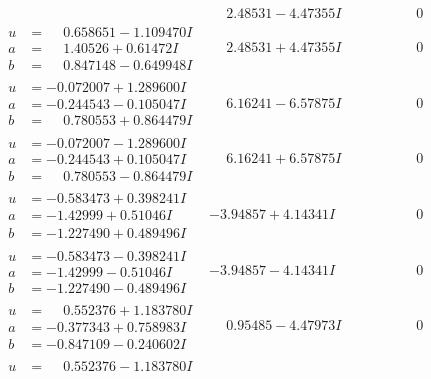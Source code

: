 \documentclass[1p]{elsarticle_modified}
\theoremstyle{definition}
\begin{document}
$$\begin{array}{c|c|c}
 & \phantom{-}2.48531 - 4.47355 I & \phantom{-0.000000 } 0 \\ \hline\begin{aligned}
u &= \phantom{-}0.658651 - 1.109470 I \\
a &= \phantom{-}1.40526 + 0.61472 I \\
b &= \phantom{-}0.847148 - 0.649948 I\end{aligned}
 & \phantom{-}2.48531 + 4.47355 I & \phantom{-0.000000 } 0 \\ \hline\begin{aligned}
u &= -0.072007 + 1.289600 I \\
a &= -0.244543 - 0.105047 I \\
b &= \phantom{-}0.780553 + 0.864479 I\end{aligned}
 & \phantom{-}6.16241 - 6.57875 I & \phantom{-0.000000 } 0 \\ \hline\begin{aligned}
u &= -0.072007 - 1.289600 I \\
a &= -0.244543 + 0.105047 I \\
b &= \phantom{-}0.780553 - 0.864479 I\end{aligned}
 & \phantom{-}6.16241 + 6.57875 I & \phantom{-0.000000 } 0 \\ \hline\begin{aligned}
u &= -0.583473 + 0.398241 I \\
a &= -1.42999 + 0.51046 I \\
b &= -1.227490 + 0.489496 I\end{aligned}
 & -3.94857 + 4.14341 I & \phantom{-0.000000 } 0 \\ \hline\begin{aligned}
u &= -0.583473 - 0.398241 I \\
a &= -1.42999 - 0.51046 I \\
b &= -1.227490 - 0.489496 I\end{aligned}
 & -3.94857 - 4.14341 I & \phantom{-0.000000 } 0 \\ \hline\begin{aligned}
u &= \phantom{-}0.552376 + 1.183780 I \\
a &= -0.377343 + 0.758983 I \\
b &= -0.847109 - 0.240602 I\end{aligned}
 & \phantom{-}0.95485 - 4.47973 I & \phantom{-0.000000 } 0 \\ \hline\begin{aligned}
u &= \phantom{-}0.552376 - 1.183780 I \\

\end{aligned}
\end{array}$$
\end{document}
